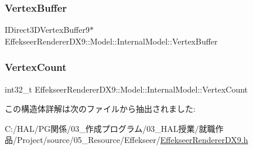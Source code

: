 \subsubsection{\texorpdfstring{Vertex\+Buffer}{VertexBuffer}}
{\footnotesize\ttfamily I\+Direct3\+D\+Vertex\+Buffer9$\ast$ Effekseer\+Renderer\+D\+X9\+::\+Model\+::\+Internal\+Model\+::\+Vertex\+Buffer}

\mbox{\label{struct_effekseer_renderer_d_x9_1_1_model_1_1_internal_model_a1eec4f06fe34a77750440a003b9aa7af}} 
\subsubsection{\texorpdfstring{Vertex\+Count}{VertexCount}}
{\footnotesize\ttfamily int32\+\_\+t Effekseer\+Renderer\+D\+X9\+::\+Model\+::\+Internal\+Model\+::\+Vertex\+Count}



この構造体詳解は次のファイルから抽出されました\+:\begin{DoxyCompactItemize}
\item 
C\+:/\+H\+A\+L/\+P\+G関係/03\+\_\+作成プログラム/03\+\_\+\+H\+A\+L授業/就職作品/\+Project/source/05\+\_\+\+Resource/\+Effekseer/\mbox{\hyperlink{_effekseer_renderer_d_x9_8h}{Effekseer\+Renderer\+D\+X9.\+h}}\end{DoxyCompactItemize}
